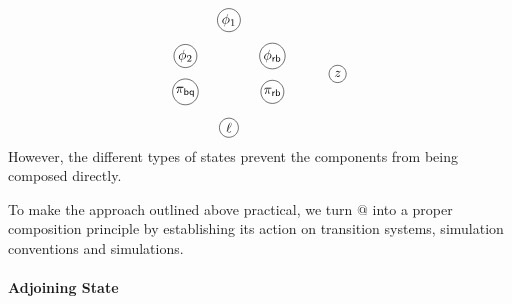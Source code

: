 \documentclass[acmsmall,screen,review,anonymous]{acmart}
\newcommand{\kw}[1]{\ensuremath{ \mathsf{#1} }}
\begin{document}
\begin{example}
\[\begin{tikzpicture}[yscale=0.45,xscale=1.1,baseline=(z.base)]
    \begin{scope}[every node/.style={circle,draw,fill=white,inner sep=1pt}]
      \node at (0,4) {$\phi_1$};
      \node at (-1,2) {$\phi_2$};
      \node at (+1,2) {$\phi_\kw{rb}$};
      \node at (-1,0) {$\pi_\kw{bq}$};
      \node at (+1,0) {$\pi_\kw{rb}$};
      \node[inner sep=2pt] at (0,-2) {$\ell$};
      \node[inner sep=2pt] (z) at (2.5,1) {$z$};
    \end{scope}
  \end{tikzpicture}
\]
However, the different types of states
prevent the components
from being composed directly.
\end{example}

To make the approach outlined above practical,
we turn $@$ into a proper composition principle
by establishing its action on
transition systems,
simulation conventions and
simulations.


\paragraph{Adjoining State} \label{sec:overview:slift} %
\end{document}
